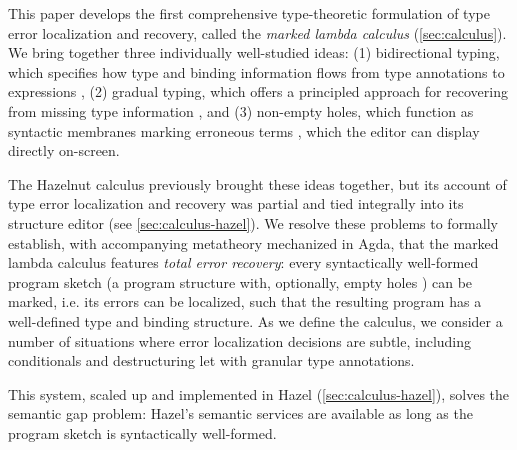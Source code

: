 This paper develops the first comprehensive {type-theoretic formulation} of type error localization and recovery, called the \emph{marked lambda calculus} (\cref{sec:calculus}).
We bring together three individually well-studied ideas: (1) bidirectional typing, which specifies how type and binding information flows from 
type annotations to expressions \cite{Localinf,BidirTyping}, (2) gradual typing, which offers a principled approach for recovering from missing type information \cite{Siek06a,siek2015refined}, and 
(3) non-empty holes, which function as syntactic membranes marking erroneous terms \cite{HazelnutPOPL}, which the editor can display directly on-screen.

The Hazelnut calculus \cite{HazelnutPOPL} previously brought these ideas together, but its account of type error localization and recovery was partial and tied integrally into its structure editor (see \cref{sec:calculus-hazel}). 
We resolve these problems to formally establish, with accompanying metatheory mechanized in Agda, that the marked lambda calculus features \emph{total error recovery}: {every} syntactically well-formed program sketch (a program structure with, optionally, empty holes \cite{solar2013program}) can be marked, i.e. its errors can be localized, such that the resulting program has a well-defined type and binding structure.
As we define the calculus, we consider a number of situations where error localization decisions are subtle, including conditionals and destructuring let with granular type annotations.

This system, scaled up and implemented in Hazel (\cref{sec:calculus-hazel}), solves the semantic gap problem: Hazel's semantic services are available as long as the program sketch is syntactically well-formed.
% 

